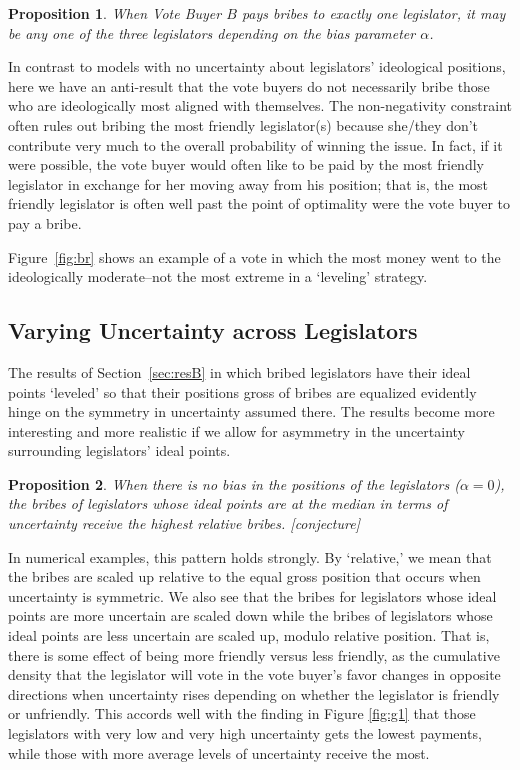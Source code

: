 \documentclass[12pt]{article}
\newtheorem{proposition}{Proposition}
\newcommand{\al}{\alpha}
\begin{document}
\begin{proposition}
  When Vote Buyer $B$ pays bribes to exactly one legislator, it may be any one of the three legislators depending on the bias parameter $\al$.
	\label{prop:1NNB}
\end{proposition}
In contrast to models with no uncertainty about legislators' ideological positions, here we have an anti-result that the vote buyers do not necessarily bribe those who are ideologically most aligned with themselves. The non-negativity constraint often rules out bribing the most friendly legislator(s) because she/they don't contribute very much to the overall probability of winning the issue. In fact, if it were possible, the vote buyer would often like to be paid by the most friendly legislator in exchange for her moving away from his position; that is, the most friendly legislator is often well past the point of optimality were the vote buyer to pay a bribe.

Figure~\ref{fig:br} shows an example of a vote in which the most money went to the ideologically moderate--not the most extreme in a `leveling' strategy.


\subsection{Varying Uncertainty across Legislators}
\label{sec:resunc}

The results of Section~\ref{sec:resB} in which bribed legislators have their ideal points `leveled' so that their positions gross of bribes are equalized evidently hinge on the symmetry in uncertainty assumed there. The results become more interesting and more realistic if we allow for asymmetry in the uncertainty surrounding legislators' ideal points.

\begin{proposition}
  When there is no bias in the positions of the legislators ($\al =0$), the bribes of legislators whose ideal points are at the median in terms of uncertainty receive the highest relative bribes. [conjecture]
	\label{prop:asym}
\end{proposition}
In numerical examples, this pattern holds strongly. By `relative,' we mean that the bribes are scaled up relative to the equal gross position that occurs when uncertainty is symmetric. We also see that the bribes for legislators whose ideal points are more uncertain are scaled down while the bribes of legislators whose ideal points are less uncertain are scaled up, modulo relative position. That is, there is some effect of being more friendly versus less friendly, as the cumulative density that the legislator will vote in the vote buyer's favor changes in opposite directions when uncertainty rises depending on whether the legislator is friendly or unfriendly. This accords well with the finding in Figure \ref{fig:g1} that those legislators with very low and very high uncertainty gets the lowest payments, while those with more average levels of uncertainty receive the most.
\end{document}
